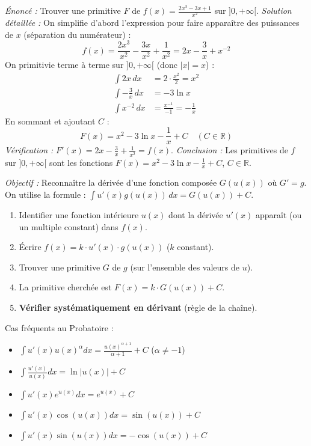\documentclass[11pt]{article}
\newcommand{\cle}[1]{{\popxbold\color{popdark}#1}}
\begin{document}
\begin{exoresolu}
\emph{Énoncé :} Trouver une primitive $F$ de $f(x) = \frac{2x^3 - 3x + 1}{x^2}$ sur $]0, +\infty[$.
\tcblower
\emph{Solution détaillée :}
On simplifie d'abord l'expression pour faire apparaître des puissances de $x$ (séparation du numérateur) :
\[ f(x) = \frac{2x^3}{x^2} - \frac{3x}{x^2} + \frac{1}{x^2} = 2x - \frac{3}{x} + x^{-2} \]
On primitivie terme à terme sur $]0, +\infty[$ (donc $|x|=x$) :
\begin{align*}
\int 2x \, dx &= 2 \cdot \frac{x^2}{2} = x^2 \\
\int -\frac{3}{x} \, dx &= -3 \ln x \\
\int x^{-2} \, dx &= \frac{x^{-1}}{-1} = -\frac{1}{x}
\end{align*}
En sommant et ajoutant $C$ :
\[ F(x) = x^2 - 3\ln x - \frac{1}{x} + C \quad (C \in \mathbb{R}) \]
\emph{Vérification :} $F'(x) = 2x - \frac{3}{x} + \frac{1}{x^2} = f(x)$.
\emph{Conclusion :} Les primitives de $f$ sur $]0,+\infty[$ sont les fonctions $F(x) = x^2 - 3\ln x - \frac{1}{x} + C$, $C \in \mathbb{R}$.
\end{exoresolu}

\begin{methode}
\emph{Objectif :} Reconnaître la dérivée d'une fonction composée $G(u(x))$ où $G'=g$. On utilise la formule : $\int u'(x) g(u(x)) \, dx = G(u(x)) + C$.
\begin{enumerate}
    \item Identifier une fonction intérieure $u(x)$ dont la dérivée $u'(x)$ apparaît (ou un multiple constant) dans $f(x)$.
    \item Écrire $f(x) = k \cdot u'(x) \cdot g(u(x))$ ($k$ constant).
    \item Trouver une primitive $G$ de $g$ (sur l'ensemble des valeurs de $u$).
    \item La primitive cherchée est $F(x) = k \cdot G(u(x)) + C$.
    \item \textbf{Vérifier systématiquement en dérivant} (règle de la chaîne).
\end{enumerate}
\cle{Cas fréquents au Probatoire :}
\begin{itemize}
    \item $\int u'(x) u(x)^\alpha dx = \frac{u(x)^{\alpha+1}}{\alpha+1}+C$ ($\alpha \neq -1$)
    \item $\int \frac{u'(x)}{u(x)} dx = \ln|u(x)|+C$
    \item $\int u'(x) e^{u(x)} dx = e^{u(x)}+C$
    \item $\int u'(x) \cos(u(x)) dx = \sin(u(x))+C$
    \item $\int u'(x) \sin(u(x)) dx = -\cos(u(x))+C$
\end{itemize}
\end{methode}
\end{document}
